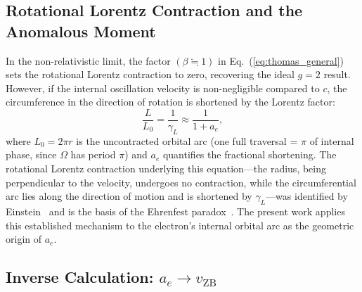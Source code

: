 \documentclass[%
 reprint, amsmath,amssymb, aps, prb, ]{revtex4-2}
\numberwithin{equation}{section}
\newcommand{\vZB}{v_{\text{ZB}}}
\newcommand{\gammaL}{\gamma_{L}}
\begin{document}
\subsection{\label{sec:lorentz_contraction}Rotational Lorentz Contraction and the Anomalous Moment}

In the non-relativistic limit, the factor $(\beta \fallingdotseq 1)$ in Eq.~(\ref{eq:thomas_general}) sets the rotational Lorentz contraction to zero, recovering the ideal $g = 2$ result. However, if the internal oscillation velocity is non-negligible compared to $c$, the circumference in the direction of rotation is shortened by the Lorentz factor:
\begin{equation}
\frac{L}{L_0} = \frac{1}{\gammaL} \approx \frac{1}{1 + a_e},
\label{eq:lorentz_arc}
\end{equation}
where $L_0 = 2\pi r$ is the uncontracted orbital arc (one full traversal = $\pi$ of internal phase, since $\Omega$ has period $\pi$) and $a_e$ quantifies the fractional shortening. The rotational Lorentz contraction underlying this equation---the radius, being perpendicular to the velocity, undergoes no contraction, while the circumferential arc lies along the direction of motion and is shortened by $\gammaL$---was identified by Einstein~\cite{Einstein1912} and is the basis of the Ehrenfest paradox~\cite{Ehrenfest1909}. The present work applies this established mechanism to the electron's internal orbital arc as the geometric origin of $a_e$.

\subsection{\label{sec:inverse}Inverse Calculation: $a_e \to \vZB$}
\end{document}
